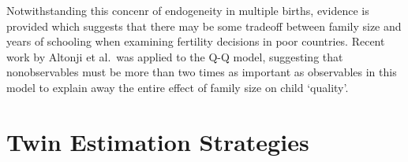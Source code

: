 \documentclass{article}[11pt,subeqn]
\begin{document}
\begin{spacing}{1.5}
Notwithstanding this concenr of endogeneity in multiple births, evidence is provided which suggests that there may be some tradeoff between family size and years of schooling when examining fertility decisions in poor countries.  Recent work by Altonji et al.\ was applied to the Q-Q model, suggesting that nonobservables must be more than two times as important as observables in this model to explain away the entire effect of family size on child `quality'.


\newpage


\newpage
\appendix
\section{Twin Estimation Strategies}
\label{scn:litrev}

\vspace{19.2cm}	


\end{spacing}
\end{document}
